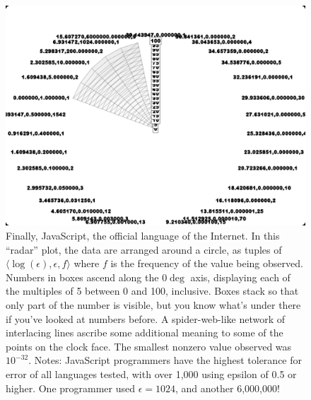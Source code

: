\documentclass[twocolumn]{article}
\begin{document}
\begin{figure}[ht]
\begin{center}
\includegraphics[width=0.70 \linewidth]{chart-js}
\end{center}\vspace{-0.1in}
\caption{Finally, JavaScript, the official language of the Internet.
  In this ``radar'' plot, the data are arranged around a circle, as
  tuples of $\langle \log(\epsilon), \epsilon, f \rangle$ where $f$ is
  the frequency of the value being observed. Numbers in boxes ascend
  along the $0\deg$ axis, displaying each of the multiples of 5
  between 0 and 100, inclusive. Boxes stack so that only part of the
  number is visible, but you know what's under there if you've looked
  at numbers before. A spider-web-like network of interlacing lines
  ascribe some additional meaning to some of the points on the clock
  face. The smallest nonzero value observed was $10^{-32}$.
%
  Notes: JavaScript programmers have the highest tolerance for error
  of all languages tested, with over 1,000 using epsilon of 0.5 or
  higher. One programmer used $\epsilon = 1024$, and another
  6,000,000! }
\label{fig:javascript}
\end{figure}


{}

\end{document}
